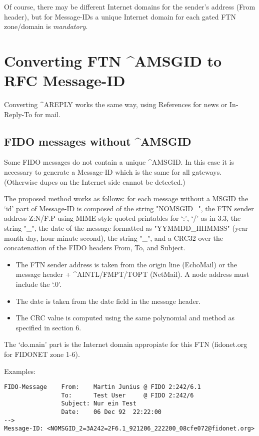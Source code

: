 \documentclass[letterpaper]{article}
\begin{document}
Of course, there may be different Internet domains for the sender's address (From header), but for Message-IDs a unique Internet domain for each gated FTN zone/domain is {\itshape mandatory\/}. 


\section{Converting FTN \^{}AMSGID to RFC Message-ID }



Converting \^{}AREPLY works the same way, using References for news or In-Reply-To for mail. 


\subsection{FIDO messages without \^{}AMSGID }



Some FIDO messages do not contain a unique \^{}AMSGID. In this case it is necessary to generate a Message-ID which is the same for all gateways. (Otherwise dupes on the Internet side cannot be detected.)

The proposed method works as follows: for each message without a MSGID the `id' part of Message-ID is composed of the string "NOMSGID\_", the FTN sender address Z:N/F.P using MIME-style quoted printables for `:', `/' as in 3.3, the string "\_", the date of the message formatted as "YYMMDD\_HHMMSS" (year month day, hour minute second), the string "\_", and a CRC32 over the concatenation of the FIDO headers From, To, and Subject. 
\begin{itemize}
\item The FTN sender address is taken from the origin line (EchoMail) or the message header + \^{}AINTL/FMPT/TOPT (NetMail). A node address must include the `.0'.  
\item The date is taken from the date field in the message header.  
\item The CRC value is computed using the same polynomial and method as specified in section 6.   
\end{itemize}


The `do.main' part is the Internet domain appropiate for this FTN (fidonet.org for FIDONET zone 1-6).

Examples:
\begin{verbatim}
FIDO-Message    From:    Martin Junius @ FIDO 2:242/6.1 
                To:      Test User     @ FIDO 2:242/6 
                Subject: Nur ein Test 
                Date:    06 Dec 92  22:22:00 
--> 
Message-ID: <NOMSGID_2=3A242=2F6.1_921206_222200_08cfe072@fidonet.org> 
\end{verbatim}
\end{document}
